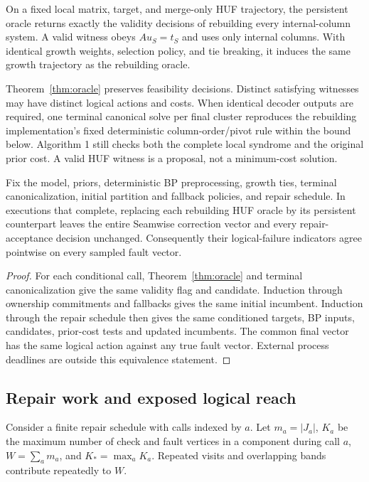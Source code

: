 \begin{theorem}\label{thm:oracle}
On a fixed local matrix, target, and merge-only HUF trajectory, the persistent oracle returns exactly the validity decisions of rebuilding every internal-column system. A valid witness obeys $Au_S=t_S$ and uses only internal columns. With identical growth weights, selection policy, and tie breaking, it induces the same growth trajectory as the rebuilding oracle.
\end{theorem}
Theorem~\ref{thm:oracle} preserves feasibility decisions. Distinct satisfying witnesses may have distinct logical actions and costs. When identical decoder outputs are required, one terminal canonical solve per final cluster reproduces the rebuilding implementation's fixed deterministic column-order/pivot rule within the bound below. Algorithm 1 still checks both the complete local syndrome and the original prior cost. A valid HUF witness is a proposal, not a minimum-cost solution.

\begin{corollary}\label{cor:outerequivalence}
Fix the model, priors, deterministic BP preprocessing, growth ties, terminal canonicalization, initial partition and fallback policies, and repair schedule. In executions that complete, replacing each rebuilding HUF oracle by its persistent counterpart leaves the entire Seamwise correction vector and every repair-acceptance decision unchanged. Consequently their logical-failure indicators agree pointwise on every sampled fault vector.
\end{corollary}
\begin{proof}
For each conditional call, Theorem~\ref{thm:oracle} and terminal canonicalization give the same validity flag and candidate. Induction through ownership commitments and fallbacks gives the same initial incumbent. Induction through the repair schedule then gives the same conditioned targets, BP inputs, candidates, prior-cost tests and updated incumbents. The common final vector has the same logical action against any true fault vector. External process deadlines are outside this equivalence statement.
\end{proof}

\subsection{Repair work and exposed logical reach}\label{sec:work}
Consider a finite repair schedule with calls indexed by $a$. Let $m_a=|J_a|$, $K_a$ be the maximum number of check and fault vertices in a component during call $a$, $W=\sum_a m_a$, and $K_*=\max_aK_a$. Repeated visits and overlapping bands contribute repeatedly to $W$.

